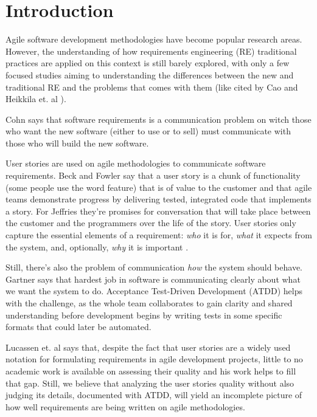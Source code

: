 \chapter{\label{chap:intro}Introduction}

Agile software development methodologies have become popular research areas. However, the understanding of how requirements engineering (RE) traditional practices are applied on this context is still barely explored, with only a few focused studies aiming to understanding the differences between the new and traditional RE and the problems that comes with them (like cited by Cao \cite{Cao_2008} and Heikkila et. al \cite{Heikkila_et_dot_al_2015}).

Cohn \cite{Cohn_2004} says that software requirements is a communication problem on witch those who want the new software (either to use or to sell) must communicate with those who will build the new software.

User stories are used on agile methodologies to communicate software requirements. Beck and Fowler\cite{Beck_Fowler_2000} say that a user story is a chunk of functionality (some people use the word feature) that is of value to the customer and that agile teams demonstrate progress by delivering tested, integrated code that implements a story. For Jeffries  \cite{Jeffries_2000} they're promises for conversation that will take place between the customer and the programmers over the life of the story. User stories only capture the essential elements of a requirement: \textit{who} it is for, \textit{what} it expects from the system, and, optionally, \textit{why} it is important \cite{Lucassen_et_dot_al_2015}.

Still, there's also the problem of communication \textit{how} the system should behave. Gartner \cite{Gartner_2012} says that hardest job in software is communicating clearly about what we want the system to do. Acceptance Test-Driven Development (ATDD) helps with the challenge, as the whole team collaborates to gain clarity and shared understanding before development begins by writing tests in some specific formats that could later be automated. 

Lucassen et. al \cite{Lucassen_et_dot_al_2015} says that, despite the fact that user stories are a widely used notation for formulating requirements in agile development projects, little to no academic work is available on assessing their quality and his work helps to fill that gap. Still, we believe that analyzing the user stories quality without also judging its details, documented with ATDD, will yield an incomplete picture of how well requirements are being written on agile methodologies.

